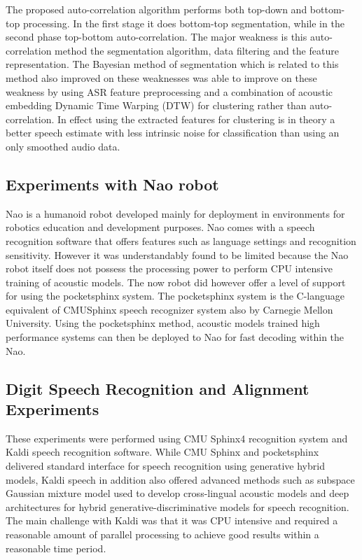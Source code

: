 The proposed auto-correlation algorithm performs both top-down and bottom-top processing.  In the first stage it does bottom-top segmentation, while in the second phase top-bottom auto-correlation.   The major weakness is this auto-correlation method the segmentation algorithm, data filtering and the feature representation.  The Bayesian method of segmentation \citep{kamper2016unsupervised} which is related to this method also improved on these weaknesses was able to improve on these weakness by using ASR feature preprocessing and a combination of acoustic embedding Dynamic Time Warping (DTW) for clustering rather than auto-correlation.  In effect using the extracted features for clustering is in theory a better speech estimate with less intrinsic noise for classification than using an only smoothed audio data.

\subsection{Experiments with Nao robot}
Nao is a humanoid robot developed mainly for deployment in environments for robotics education and development purposes.  Nao comes with a speech recognition software that offers features such as language settings and recognition sensitivity.  However it was understandably found to be limited because the Nao robot itself does not possess the processing power to perform CPU intensive training of acoustic models.  The now robot did however offer a level of support for using the pocketsphinx system. The pocketsphinx system is the C-language equivalent of CMUSphinx speech recognizer system also by Carnegie Mellon University.  Using the pocketsphinx method, acoustic models trained high performance systems can then be deployed to Nao for fast decoding within the Nao.  

\subsection{Digit Speech Recognition and Alignment Experiments}\label{sec_digitspeech}
These experiments were performed using CMU Sphinx4 recognition system and Kaldi speech recognition software.  While CMU Sphinx and pocketsphinx delivered standard interface for speech recognition using generative hybrid models, Kaldi speech in addition also offered advanced methods such as subspace Gaussian mixture model used to develop cross-lingual acoustic models and deep architectures for hybrid generative-discriminative models for speech recognition.   The main challenge with Kaldi was that it was CPU intensive and required a reasonable amount of parallel processing to achieve good results within a reasonable time period. 

